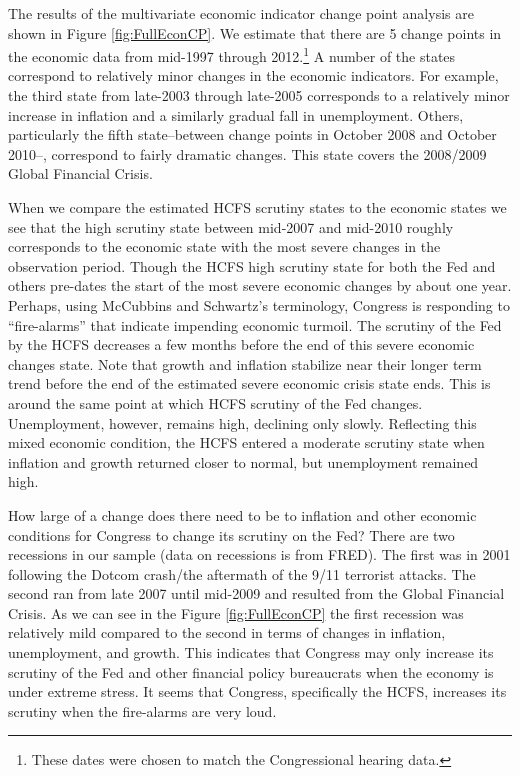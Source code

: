 \documentclass[a4paper]{article}\usepackage[]{graphicx}\usepackage[]{color}
\begin{document}
The results of the multivariate economic indicator change point analysis are shown in Figure \ref{fig:FullEconCP}. We estimate that there are 5 change points in the economic data from mid-1997 through 2012.\footnote{These dates were chosen to match the Congressional hearing data.} A number of the states correspond to relatively minor changes in the economic indicators. For example, the third state from late-2003 through late-2005 corresponds to a relatively minor increase in inflation and a similarly gradual fall in unemployment. Others, particularly the fifth state--between change points in October 2008 and October 2010--, correspond to fairly dramatic changes. This state covers the 2008/2009 Global Financial Crisis.

When we compare the estimated HCFS scrutiny states to the economic states we see that the high scrutiny state between mid-2007 and mid-2010 roughly corresponds to the economic state with the most severe changes in the observation period. Though the HCFS high scrutiny state for both the Fed and others pre-dates the start of the most severe economic changes by about one year. Perhaps, using McCubbins and Schwartz's \citeyearpar{Mccubbins1984} terminology, Congress is responding to ``fire-alarms'' that indicate impending economic turmoil. The scrutiny of the Fed by the HCFS decreases a few months before the end of this severe economic changes state. Note that growth and inflation stabilize near their longer term trend before the end of the estimated severe economic crisis state ends. This is around the same point at which HCFS scrutiny of the Fed changes. Unemployment, however, remains high, declining only slowly. Reflecting this mixed economic condition, the HCFS entered a moderate scrutiny state when inflation and growth returned closer to normal, but unemployment remained high.

How large of a change does there need to be to inflation and other economic conditions for Congress to change its scrutiny on the Fed? There are two recessions in our sample (data on recessions is from FRED). The first was in 2001 following the Dotcom crash/the aftermath of the 9/11 terrorist attacks. The second ran from late 2007 until mid-2009 and resulted from the Global Financial Crisis. As we can see in the Figure \ref{fig:FullEconCP} the first recession was relatively mild compared to the second in terms of changes in inflation, unemployment, and growth. This indicates that Congress may only increase its scrutiny of the Fed and other financial policy bureaucrats when the economy is under extreme stress. It seems that Congress, specifically the HCFS, increases its scrutiny when the fire-alarms are very loud.
\end{document}
